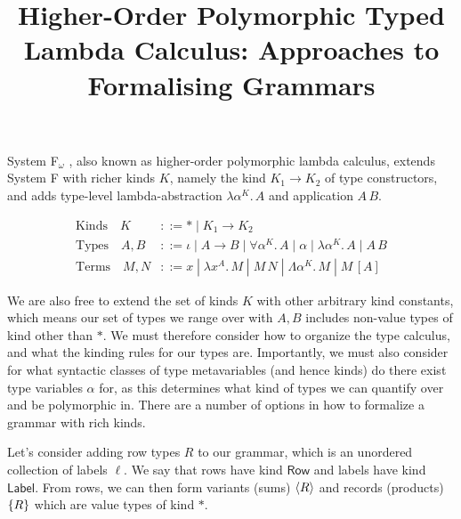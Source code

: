 \documentclass[acmsmall, 9pt]{article}
\begin{document}
\pagestyle{empty}

\title{Higher-Order Polymorphic Typed Lambda Calculus: Approaches to Formalising Grammars}

\maketitle
\noindent
System F$_\omega$ \cite{cambridge-lambda-calc, pierce2002types}, also known as higher-order polymorphic lambda calculus, extends System F with richer kinds $K$, namely the kind $K_1 \rightarrow K_2$ of type constructors, and adds type-level lambda-abstraction $\lambda \alpha^K. \, A$ and application $A\,B$.

\begin{align*}
  \text{Kinds} \quad K &::= * \; | \; K_1 \rightarrow K_2\\
  \text{Types} \quad  A, B &::= \iota \; | \;  A \rightarrow B \; | \; \forall \alpha^K . \, A\; | \; \alpha \; | \; \lambda \alpha^K. \, A \; | \; A \, B\\
  \text{Terms} \quad M, N &::= x \; | \; \lambda x^A . \, M \; | \; M \, N  \; | \; \Lambda \alpha^K . \, M \; | \; M \, [A]
\end{align*}

We are also free to extend the set of kinds $K$ with other arbitrary kind constants, which means our set of types we range over with $A, B$ includes non-value types of kind other than $*$. We must therefore consider how to organize the type calculus, and what the kinding rules for our types are. Importantly, we must also consider for what syntactic classes of type metavariables (and hence kinds) do there exist type variables $\alpha$ for, as this determines what kind of types we can quantify over and be polymorphic in. There are a number of options in how to formalize a grammar with rich kinds.

Let's consider adding row types $R$ to our grammar, which is an unordered collection of labels $\ell$. We say that rows have kind $\mathsf{Row}$ and labels have kind $\mathsf{Label}$. From rows, we can then form variants (sums) $\langle R \rangle$ and records (products) $\{ R \}$ which are value types of kind $*$.
\end{document}
